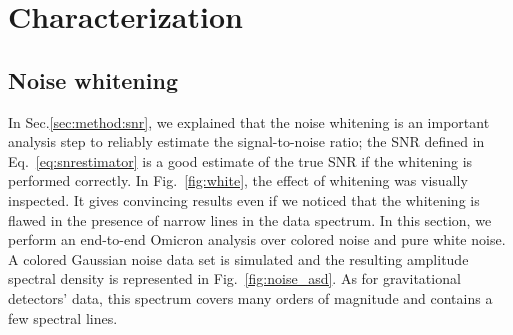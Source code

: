 \section{Characterization} \label{sec:characterization}

\subsection{Noise whitening} \label{sec:characterization:whitening}
In Sec.\ref{sec:method:snr}, we explained that the noise whitening is an important analysis step to reliably estimate the signal-to-noise ratio; the SNR defined in Eq.~\ref{eq:snrestimator} is a good estimate of the true SNR if the whitening is performed correctly. In Fig.~\ref{fig:white}, the effect of whitening was visually inspected. It gives convincing results even if we noticed that the whitening is flawed in the presence of narrow lines in the data spectrum. In this section, we perform an end-to-end Omicron analysis over colored noise and pure white noise. A colored Gaussian noise data set is simulated and the resulting amplitude spectral density is represented in Fig.~\ref{fig:noise_asd}. As for gravitational detectors' data, this spectrum covers many orders of magnitude and contains a few spectral lines.


